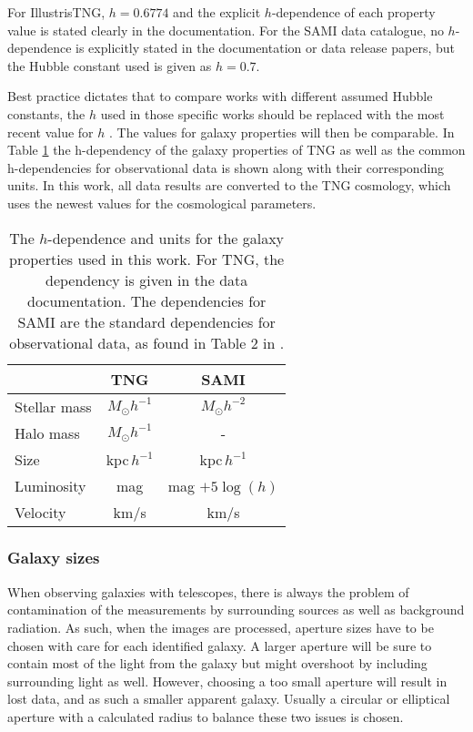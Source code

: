 For IllustrisTNG, $h=0.6774$ and the explicit $h$-dependence of each property value is stated clearly in the documentation. For the SAMI data catalogue, no $h$-dependence is explicitly stated in the documentation or data release papers, but the Hubble constant used is given as $h = 0.7$.

Best practice dictates that to compare works with different assumed Hubble constants, the $h$ used in those specific works should be replaced with the most recent value for $h$ \parencite{Croton2013}. The values for galaxy properties will then be comparable. In Table \ref{h_dependence} the h-dependency of the galaxy properties of TNG as well as the common h-dependencies for observational data is shown along with their corresponding units. In this work, all data results are converted to the TNG cosmology, which uses the newest values for the cosmological parameters.

\begin{table}
\begin{center}
\caption{The $h$-dependence and units for the galaxy properties used in this work. For TNG, the dependency is given in the data documentation. The dependencies for SAMI are the standard dependencies for observational data, as found in Table 2 in \textcite{Croton2013}.}
\label{h_dependence}
\begin{tabular}{ l| c c }
 \hline
 \hline
   & TNG & SAMI \\
 \hline
 Stellar mass & $M_{\odot}h^{-1}$ & $M_{\odot}h^{-2}$ \\ 
 Halo mass & $M_{\odot}h^{-1}$ & - \\
 Size & kpc$\,h^{-1}$ & kpc$\,h^{-1}$ \\
 Luminosity & mag & mag $+5\log(h)$ \\
 Velocity & km/s & km/s  \\ 

 \hline 
\end{tabular}
\end{center}
\end{table}

\subsubsection{Galaxy sizes} \label{galaxy_size}
When observing galaxies with telescopes, there is always the problem of contamination of the measurements by surrounding sources as well as background radiation. As such, when the images are processed, aperture sizes have to be chosen with care for each identified galaxy. A larger aperture will be sure to contain most of the light from the galaxy but might overshoot by including surrounding light as well. However, choosing a too small aperture will result in lost data, and as such a smaller apparent galaxy. Usually a circular or elliptical aperture with a calculated radius to balance these two issues is chosen.

